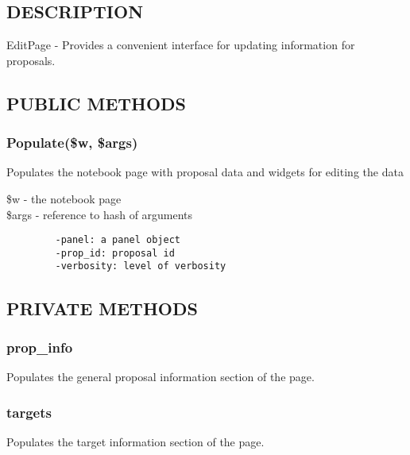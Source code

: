 \documentclass{article}
\begin{document}
\subsection*{DESCRIPTION\label{EditPage_DESCRIPTION}}


EditPage - Provides a convenient interface for updating information for
proposals.

\subsection*{PUBLIC METHODS\label{EditPage_PUBLIC_METHODS}}
\subsubsection*{Populate(\$w, \$args)\label{EditPage_Populate_w_args_}}


Populates the notebook page with proposal data and widgets for editing the data

\begin{description}

\item[{\$w - the notebook page}] \mbox{}
\item[{\$args - reference to hash of arguments}] \mbox{}\begin{verbatim}
   -panel: a panel object
   -prop_id: proposal id
   -verbosity: level of verbosity
\end{verbatim}
\end{description}
\subsection*{PRIVATE METHODS\label{EditPage_PRIVATE_METHODS}}
\subsubsection*{prop\_info\label{EditPage_prop_info}}


Populates the general proposal information section of the page.

\subsubsection*{targets\label{EditPage_targets}}


Populates the target information section of the page.
\end{document}
